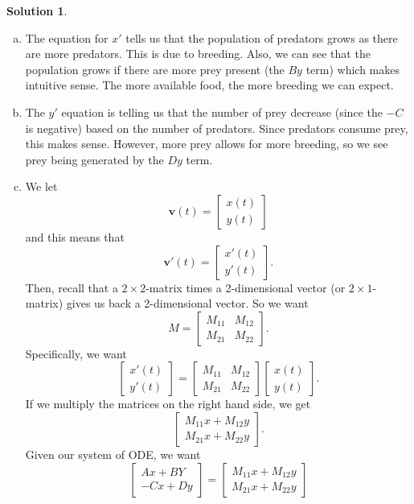 \documentclass[12pt]{report} %
\theoremstyle{definition}
\newtheorem{solution}{Solution}
\begin{document}
\begin{solution}~
\begin{enumerate}[(a)]
    \item The equation for $x'$ tells us that the population of predators grows as there are more predators.  This is due to breeding.  Also, we can see that the population grows if there are more prey present (the $By$ term) which makes intuitive sense.  The more available food, the more breeding we can expect.
    \item The $y'$ equation is telling us that the number of prey decrease (since the $-C$ is negative) based on the number of predators.  Since predators consume prey, this makes sense.  However, more prey allows for more breeding, so we see prey being generated by the $Dy$ term.
    \item We let 
    \[
    \mathbf{v}(t) = \begin{bmatrix} x(t) \\ y(t) \end{bmatrix}
    \]
    and this means that 
    \[
    \mathbf{v}'(t) = \begin{bmatrix} x'(t) \\ y'(t) \end{bmatrix}.
    \]
    Then, recall that a $2\times2$-matrix times a 2-dimensional vector (or $2\times 1$-matrix) gives us back a 2-dimensional vector.  So we want
    \[
    M= \begin{bmatrix} M_{11} & M_{12} \\ M_{21} & M_{22} \end{bmatrix}.
    \]
    Specifically, we want
    \[
    \begin{bmatrix} x'(t) \\ y'(t) \end{bmatrix} = \begin{bmatrix} M_{11} & M_{12} \\ M_{21} & M_{22} \end{bmatrix}\begin{bmatrix} x(t) \\ y(t) \end{bmatrix}.
    \]
    If we multiply the matrices on the right hand side, we get
    \[
    \begin{bmatrix} M_{11} x + M_{12} y\\ M_{21} x + M_{22}y \end{bmatrix}.
    \]
    Given our system of ODE, we want
    \[
    \begin{bmatrix} Ax + BY \\ -Cx + Dy \end{bmatrix} = \begin{bmatrix} M_{11} x + M_{12} y\\ M_{21} x + M_{22}y \end{bmatrix}
\]
\end{enumerate}
\end{solution}
\end{document}

